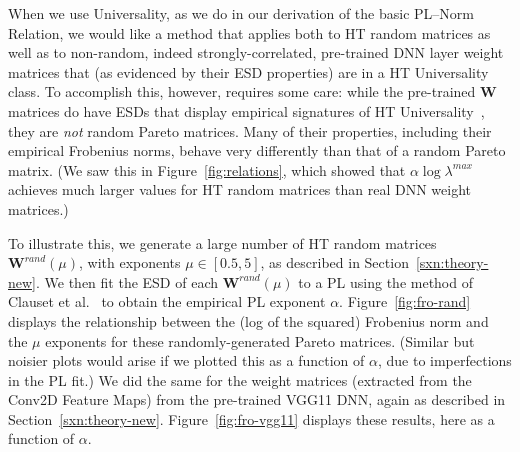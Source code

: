 {When we use Universality, as we do in our derivation of 
the basic PL--Norm Relation, 
we would like a method that applies both to HT random matrices as well as to non-random, indeed strongly-correlated, pre-trained DNN layer weight matrices that (as evidenced by their ESD properties) are in a HT Universality class.  
To accomplish this, however, requires some care: while the pre-trained $\mathbf{W}$ matrices do have ESDs that display empirical signatures of HT Universality~\cite{MM18_TR,MM19_HTSR_ICML}, they are \emph{not} random Pareto matrices.
Many of their properties, including their empirical Frobenius norms, behave very differently than that of a random Pareto matrix.  
(We saw this in Figure~\ref{fig:relations}, which showed that $ \alpha\log\lambda^{max} $ achieves much larger values for HT random matrices than real DNN weight matrices.)

To illustrate this, we generate a large number of HT random matrices $\mathbf{W}^{rand}(\mu)$, with exponents $\mu\in[0.5, 5]$, as described in Section~\ref{sxn:theory-new}.
%
We then fit the ESD of each $\mathbf{W}^{rand}(\mu)$ to a PL using the method of Clauset et al.~\cite{CSN09_powerlaw,ABP14} to obtain the empirical PL exponent $\alpha$. 
Figure~\ref{fig:fro-rand} displays the relationship between the (log of the squared) Frobenius norm and the $\mu$ exponents for these randomly-generated Pareto matrices.
(Similar but noisier plots would arise if we plotted this as a function of $\alpha$, due to imperfections in the PL fit.)
We did the same for the weight matrices (extracted from the Conv2D Feature Maps) from the pre-trained VGG11 DNN, again as described in Section~\ref{sxn:theory-new}.
Figure~\ref{fig:fro-vgg11} displays these results, here as a function of $\alpha$.

}
